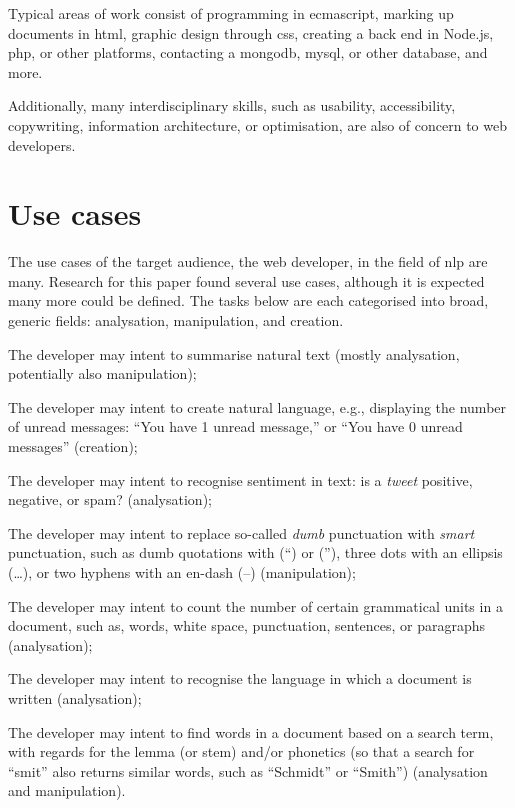 Typical areas of work consist of programming in \gls{ecmascript},
  marking up documents in \gls{html}, graphic design through \gls{css},
  creating a back end in Node.js, \gls{php}, or other platforms, contacting a
  \gls{mongodb}, \gls{mysql}, or other database, and more.

Additionally, many interdisciplinary skills, such as usability,
  accessibility, copywriting, information architecture, or optimisation,
  are also of concern to web developers.

\section{Use cases}\label{use-cases}

The use cases of the target audience, the web developer, in the field of
  \gls{nlp} are many.
Research for this paper found several use cases, although it is
  expected many more could be defined.
The tasks below are each categorised into broad, generic fields: analysation,
  manipulation, and creation.

\begin{aenumerate}
\item\label{list:use-case:1} The developer may intent to summarise natural
  text (mostly analysation, potentially also manipulation);
\item\label{list:use-case:2} The developer may intent to create natural
  language, e.g., displaying the number of unread messages: ``You have 1
  unread message,'' or ``You have 0 unread messages'' (creation);
\item\label{list:use-case:3} The developer may intent to recognise sentiment
  in text: is a \emph{tweet} positive, negative, or spam? (analysation);
\item\label{list:use-case:4} The developer may intent to replace so-called
  \emph{dumb} punctuation with \emph{smart} punctuation, such as dumb
  quotations with (``) or (''), three dots with an ellipsis (\ldots{}), or
  two hyphens with an en-dash (--) (manipulation);
\item\label{list:use-case:5} The developer may intent to count the number of
  certain grammatical units in a document, such as, words, white space,
  punctuation, sentences, or paragraphs (analysation);
\item\label{list:use-case:6} The developer may intent to recognise the
  language in which a document is written (analysation);
\item\label{list:use-case:7} The developer may intent to find words in a
  document based on a search term, with regards for the lemma (or stem)
  and\slash or phonetics (so that a search for ``smit'' also returns similar
  words, such as ``Schmidt'' or ``Smith'') (analysation and manipulation).
\end{aenumerate}

